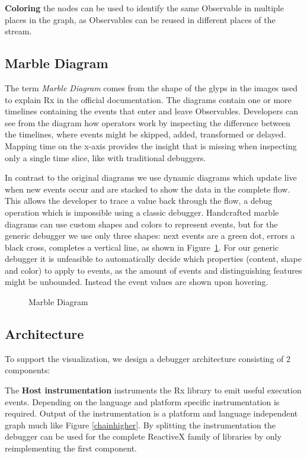 \textbf{Coloring} the nodes can be used to identify the same Observable in multiple places in the graph, as Observables can be reused in different places of the stream.

\subsection{Marble Diagram}
The term \textit{Marble Diagram} comes from the shape of the glyps in the images used to explain Rx in the official documentation. The diagrams contain one or more timelines containing the events that enter and leave Observables. Developers can see from the diagram how operators work by inspecting the difference between the timelines, where events might be skipped, added, transformed or delayed. Mapping time on the x-axis provides the insight that is missing when inspecting only a single time slice, like with traditional debuggers.

In contrast to the original diagrams we use dynamic diagrams which update live when new events occur and are stacked to show the data in the complete flow. This allows the developer to trace a value back through the flow, a debug operation which is impossible using a classic debugger. Handcrafted marble diagrams can use custom shapes and colors to represent events, but for the generic debugger we use only three shapes: next events are a green dot, errors a black cross, completes a vertical line, as shown in Figure~\ref{marblediagram}. For our generic debugger it is unfeasible to automatically decide which properties (content, shape and color) to apply to events, as the amount of events and distinguishing features might be unbounded. Instead the event values are shown upon hovering.

\begin{figure}[ht]
	\centering
	
	\caption{Marble Diagram}
	\label{marblediagram}
\end{figure} 

\subsection{Architecture}
To support the visualization, we design a debugger architecture consisting of 2 components:

The \textbf{Host instrumentation} instruments the Rx library to emit useful execution events. Depending on the language and platform specific instrumentation is required. Output of the instrumentation is a platform and language independent graph much like Figure \ref{chainhigher}. By splitting the instrumentation the debugger can be used for the complete ReactiveX family of libraries by only reimplementing the first component. 

